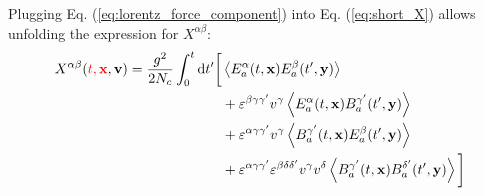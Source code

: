 Plugging Eq. (\ref{eq:lorentz_force_component}) into Eq. (\ref{eq:short_X}) allows unfolding the expression for $X^{\alpha \beta}$:
\begin{equation}
\label{eq:unfolded_X}
\begin{split}
	X^{\alpha \beta} (\textcolor{red}{t,\mathbf{x}}, \mathbf{v}) =  \frac{g^2}{2 N_c} \int_0^t \mathop{}\!\mathrm{d} t'   
	 \bigg[ &  \left< E^\alpha_a(t, \mathbf{x} ) E^\beta_a(t', \mathbf{y} )\right> \\ 
	& + \varepsilon^{\beta \gamma \gamma'} v^\gamma \left< E^\alpha_a(t, \mathbf{x} ) B^{\gamma'}_a(t', \mathbf{y} )\right> \\
	& + \varepsilon^{\alpha \gamma \gamma'} v^\gamma \left< B^{\gamma'}_a(t, \mathbf{x} ) E^{\beta}_a(t', \mathbf{y} )\right> \\
	& + \varepsilon^{\alpha \gamma \gamma'} \varepsilon^{\beta \delta \delta'} v^\gamma v^\delta \left< B^{\gamma'}_a(t, \mathbf{x} ) B^{\delta'}_a(t', \mathbf{y} )\right> \bigg]
\end{split}
\end{equation}
